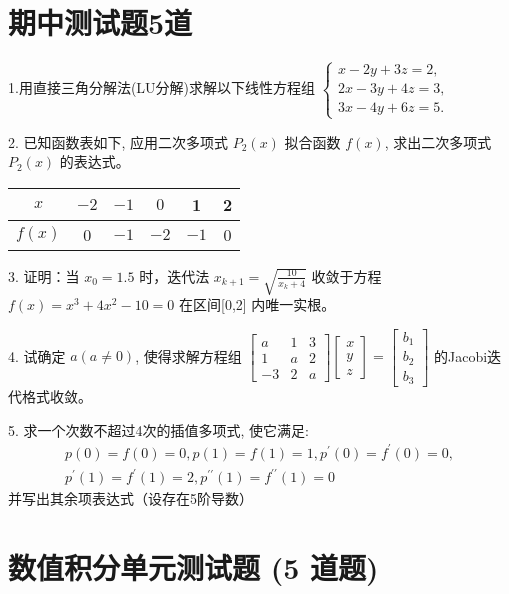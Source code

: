 \newpage
\section{期中测试题5道}

1.用直接三角分解法(LU分解)求解以下线性方程组 $ \left\{\begin{array}{l}x-2 y+3 z=2, \\ 2 x-3 y+4 z=3, \\ 3 x-4 y+6 z=5 .\end{array}\right. $

2. 已知函数表如下, 应用二次多项式 $ P_{2}(x) $ 拟合函数 $ f(x) $, 求出二次多项式 $ P_{2}(x) $ 的表达式。
\begin{center}
\begin{tabular}{|c|c|c|c|c|c|}
\hline$ x $ & $ -{2} $ & $ -{1} $ & $ {0} $ & 1 & 2 \\
\hline $ {f}({x}) $ & 0 & $-1$ & $-2$ & $-1$ & 0 \\
\hline
\end{tabular}
\end{center}

3. 证明：当 $ x_{0}=1.5 $ 时，迭代法 $ x_{k+1}=\sqrt{\frac{10}{x_{k}+4}} $ 收敛于方程 $ f(x)=x^{3}+4 x^{2}-10=0 $ 在区间[0,2] 内唯一实根。

4. 试确定 $ a(a \neq 0) $, 使得求解方程组 $ \left[\begin{array}{ccc}a & 1 & 3 \\ 1 & a & 2 \\ -3 & 2 & a\end{array}\right]\left[\begin{array}{l}x \\ y \\ z\end{array}\right]=\left[\begin{array}{l}b_{1} \\ b_{2} \\ b_{3}\end{array}\right] $ 的Jacobi迭代格式收敛。

5. 求一个次数不超过4次的插值多项式, 使它满足:
$$
\begin{array}{l}
p(0)=f(0)=0, p(1)=f(1)=1, p^{\prime}(0)=f^{\prime}(0)=0, \\
p^{\prime}(1)=f^{\prime}(1)=2, p^{\prime \prime}(1)=f^{\prime \prime}(1)=0
\end{array}
$$
并写出其余项表达式（设存在5阶导数）

\section{数值积分单元测试题 (5 道题)}

